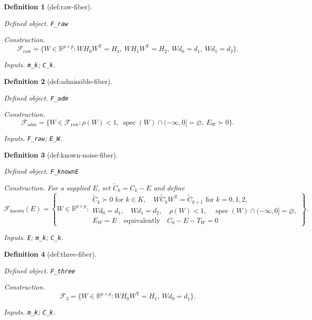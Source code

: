 \documentclass{article}
\newtheorem{definition}{Definition}
\begin{document}
\begin{definition}[def:raw-fiber]\label{def:raw-fiber}
\par\smallskip\noindent\emph{Defined object.} \texttt{F\_\allowbreak{}raw}
\par\smallskip\noindent\emph{Construction.} \[\mathcal F_{\mathrm{raw}}=\{W\in\mathbb R^{p\times p}:WH_0W^{\mathsf T}=H_1,\ WH_1W^{\mathsf T}=H_2,\ Wd_0=d_1,\ Wd_1=d_2\}.\]
\par\smallskip\noindent\emph{Inputs.} \texttt{m\_\allowbreak{}k}; \texttt{C\_\allowbreak{}k}.
\end{definition}

\begin{definition}[def:admissible-fiber]\label{def:admissible-fiber}
\par\smallskip\noindent\emph{Defined object.} \texttt{F\_\allowbreak{}adm}
\par\smallskip\noindent\emph{Construction.} \[\mathcal F_{\mathrm{adm}}=\{W\in\mathcal F_{\mathrm{raw}}:\rho(W)<1,\ \operatorname{spec}(W)\cap(-\infty,0]=\varnothing,\ E_W\succ0\}.\]
\par\smallskip\noindent\emph{Inputs.} \texttt{F\_\allowbreak{}raw}; \texttt{E\_\allowbreak{}W}.
\end{definition}

\begin{definition}[def:known-noise-fiber]\label{def:known-noise-fiber}
\par\smallskip\noindent\emph{Defined object.} \texttt{F\_\allowbreak{}knownE}
\par\smallskip\noindent\emph{Construction.} For a supplied \(E\), set \(\widetilde C_k=C_k-E\) and define \[\mathcal F_{\mathrm{known}}(E)=\left\{W\in\mathbb R^{p\times p}:\begin{array}{l}\widetilde C_k\succ0\text{ for }k\in K,\quad W\widetilde C_kW^{\mathsf T}=\widetilde C_{k+1}\text{ for }k=0,1,2,\\ Wd_0=d_1,\quad Wd_1=d_2,\quad \rho(W)<1,\quad \operatorname{spec}(W)\cap(-\infty,0]=\varnothing,\\ E_W=E\quad\text{equivalently}\quad C_0-E-T_W=0\end{array}\right\}.\]
\par\smallskip\noindent\emph{Inputs.} \texttt{E}; \texttt{m\_\allowbreak{}k}; \texttt{C\_\allowbreak{}k}.
\end{definition}

\begin{definition}[def:three-fiber]\label{def:three-fiber}
\par\smallskip\noindent\emph{Defined object.} \texttt{F\_\allowbreak{}three}
\par\smallskip\noindent\emph{Construction.} \[\mathcal F_{3}=\{W\in\mathbb R^{p\times p}:WH_0W^{\mathsf T}=H_1,\ Wd_0=d_1\}.\]
\par\smallskip\noindent\emph{Inputs.} \texttt{m\_\allowbreak{}k}; \texttt{C\_\allowbreak{}k}.
\end{definition}
\end{document}

